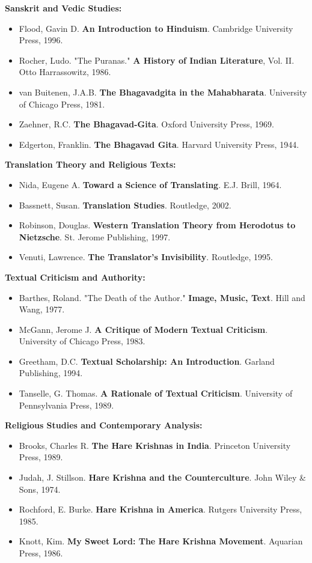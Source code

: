 \documentclass[11pt,twoside]{book}
\begin{document}
\textbf{\textbf{Sanskrit and Vedic Studies:}}
\begin{itemize}
\item Flood, Gavin D. \textbf{An Introduction to Hinduism}. Cambridge University Press, 1996.
\item Rocher, Ludo. "The Puranas." \textbf{A History of Indian Literature}, Vol. II. Otto Harrassowitz, 1986.
\item van Buitenen, J.A.B. \textbf{The Bhagavadgita in the Mahabharata}. University of Chicago Press, 1981.
\item Zaehner, R.C. \textbf{The Bhagavad-Gita}. Oxford University Press, 1969.
\item Edgerton, Franklin. \textbf{The Bhagavad Gita}. Harvard University Press, 1944.
\end{itemize}

\textbf{\textbf{Translation Theory and Religious Texts:}}
\begin{itemize}
\item Nida, Eugene A. \textbf{Toward a Science of Translating}. E.J. Brill, 1964.
\item Bassnett, Susan. \textbf{Translation Studies}. Routledge, 2002.
\item Robinson, Douglas. \textbf{Western Translation Theory from Herodotus to Nietzsche}. St. Jerome Publishing, 1997.
\item Venuti, Lawrence. \textbf{The Translator's Invisibility}. Routledge, 1995.
\end{itemize}

\textbf{\textbf{Textual Criticism and Authority:}}
\begin{itemize}
\item Barthes, Roland. "The Death of the Author." \textbf{Image, Music, Text}. Hill and Wang, 1977.
\item McGann, Jerome J. \textbf{A Critique of Modern Textual Criticism}. University of Chicago Press, 1983.
\item Greetham, D.C. \textbf{Textual Scholarship: An Introduction}. Garland Publishing, 1994.
\item Tanselle, G. Thomas. \textbf{A Rationale of Textual Criticism}. University of Pennsylvania Press, 1989.
\end{itemize}

\textbf{\textbf{Religious Studies and Contemporary Analysis:}}
\begin{itemize}
\item Brooks, Charles R. \textbf{The Hare Krishnas in India}. Princeton University Press, 1989.
\item Judah, J. Stillson. \textbf{Hare Krishna and the Counterculture}. John Wiley \& Sons, 1974.
\item Rochford, E. Burke. \textbf{Hare Krishna in America}. Rutgers University Press, 1985.
\item Knott, Kim. \textbf{My Sweet Lord: The Hare Krishna Movement}. Aquarian Press, 1986.
\end{itemize}
\end{document}
